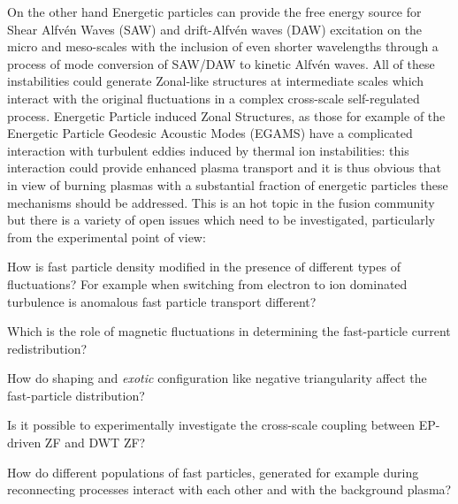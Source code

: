 \documentclass[12pt,a4paper]{article}
\begin{document}
On the other hand Energetic
particles can provide the free energy source for Shear Alfv{\'e}n
Waves (SAW) and drift-Alfv{\'e}n waves (DAW) excitation on the micro and
meso-scales \cite{Zonca:2015hs} with the inclusion of even shorter
wavelengths through a process of mode conversion of SAW/DAW to kinetic
Alfv{\'e}n waves. All of these instabilities could generate Zonal-like
structures at intermediate scales which interact with the original
fluctuations in a complex cross-scale self-regulated process. 
Energetic Particle induced Zonal Structures, as those for
example of the Energetic Particle Geodesic Acoustic Modes (EGAMS)
\cite{Zarzoso:2013kw,Nazikian:2008hk,Ido:2011gy} have a complicated
interaction with turbulent eddies induced by thermal ion
instabilities: this interaction could provide enhanced plasma transport
and it is thus obvious that in view of burning plasmas with a
substantial fraction of energetic particles these mechanisms should be
addressed. This is an hot topic in the fusion community but
there is a variety of open issues which need to be investigated,
particularly from the experimental point of view:
\begin{description}[labelindent=0pt, labelsep*=0.3em, leftmargin=!, itemsep=0.02ex]
\item[(i)] How is fast particle density modified in the presence of
  different types of fluctuations? For example when switching from electron to
  ion dominated turbulence is anomalous fast particle transport different?
\item[(ii)] Which is the role of magnetic fluctuations in determining
  the fast-particle current redistribution?
\item[(iii)] How do shaping and \emph{exotic} configuration like negative
  triangularity affect the fast-particle distribution?
\item[(iv)] Is it possible to experimentally investigate the
  cross-scale coupling between EP-driven ZF and DWT ZF?
\item[(v)] How do different populations of fast particles, generated for
  example during reconnecting processes interact with each other and
  with the background plasma?
\end{description}
\end{document}

